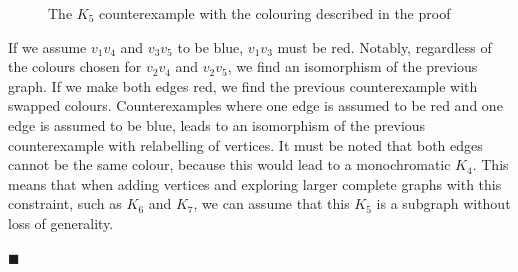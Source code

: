 \documentclass{article}
\begin{document}
\begin{figure}[h!]
\centering
{}
\caption{The $K_5$ counterexample with the colouring described in the proof}
\end{figure}
\begin{flushleft}
If we assume $v_1v_4$ and $v_3v_5$ to be blue, $v_1v_3$ must be red. Notably, regardless of the colours chosen for $v_2v_4$ and $v_2v_5$, we find an isomorphism of the previous graph. If we make both edges red, we find the previous counterexample with swapped colours. Counterexamples where  one edge is assumed to be red and one edge is assumed to be blue, leads to an isomorphism of the previous counterexample with relabelling of vertices. It must be noted that both edges cannot be the same colour, because this would lead to a monochromatic $K_4$. This means that when adding vertices and exploring larger complete graphs with this constraint, such as $K_6$ and $K_7$, we can assume that this $K_5$ is a subgraph without loss of generality.
\end{flushleft}



\hfill$\blacksquare$
\end{document}
